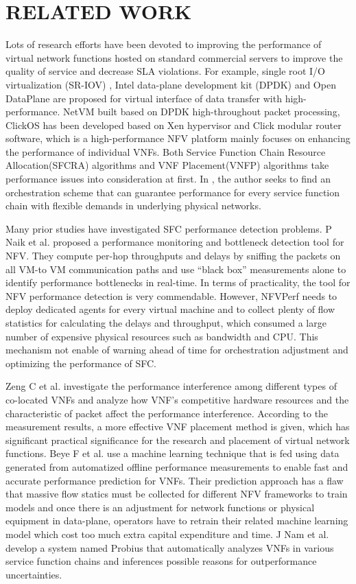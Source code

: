 \documentclass{ieeeaccess}
\begin{document}
\section{RELATED WORK}
Lots of research efforts have been devoted to improving the performance of virtual network functions hosted on standard commercial servers to improve the quality of service and decrease SLA violations. For example, single root I/O virtualization (SR-IOV)\cite{b10} , Intel data-plane development kit (DPDK)\cite{b11} and Open DataPlane\cite{b12} are proposed for virtual interface of data transfer with high-performance.    NetVM built based on DPDK high-throughout packet processing\cite{b13}, ClickOS\cite{b14}  has been developed based on Xen hypervisor and Click modular\cite{b15} router software, which is a high-performance NFV platform mainly focuses on enhancing the performance of individual VNFs. Both Service Function Chain Resource Allocation(SFCRA) algorithms and VNF Placement(VNFP) algorithms take performance issues into consideration at first\cite{b16,b17,b18}. In \cite{b19}, the author seeks to find an orchestration scheme that can guarantee performance for every service function chain with flexible demands in underlying physical networks.


Many prior studies have investigated SFC performance detection problems.
P Naik et al.\cite{b19} proposed a performance monitoring and bottleneck detection tool for NFV. They compute per-hop throughputs and delays by sniffing the packets on all VM-to VM communication paths and use ``black box'' measurements alone to identify performance bottlenecks in real-time. In terms of practicality, the tool for NFV performance detection is very commendable. However, NFVPerf needs to deploy dedicated agents for every virtual machine and to collect plenty of flow statistics for calculating the delays and throughput, which consumed a large number of expensive physical resources such as bandwidth and CPU. This mechanism not enable of warning ahead of time for orchestration adjustment and optimizing the performance of SFC.

Zeng C et al.\cite{b20} investigate the performance interference among different types of co-located VNFs and analyze how VNF’s competitive hardware resources and the characteristic of packet affect the performance interference. According to the measurement results, a more effective VNF placement method is given, which has significant practical significance for the research and placement of virtual network functions. Beye F et al.\cite{b21} use a machine learning technique that is fed using data generated from automatized offline performance measurements to enable fast and accurate performance prediction for VNFs. Their prediction approach has a flaw that massive flow statics must be collected for different NFV frameworks to train models and once there is an adjustment for network functions or physical equipment in data-plane, operators have to retrain their related machine learning model which cost too much extra capital expenditure and time. J Nam et al.\cite{b22} develop a system named Probius that automatically analyzes VNFs in various service function chains and inferences possible reasons for outperformance uncertainties.
\end{document}
